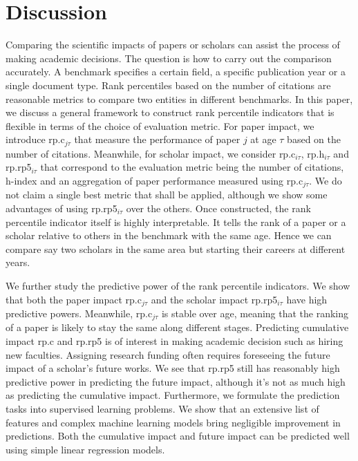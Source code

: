 \section*{Discussion}
Comparing the scientific impacts of papers or scholars can assist the process of making academic decisions. The question is how to carry out the comparison accurately. A benchmark specifies a certain field, a specific publication year or a single document type. Rank percentiles based on the number of citations are reasonable metrics to compare two entities in different benchmarks\supercite{bornmann2013use}. In this paper, we discuss a general framework to construct rank percentile indicators that is flexible in terms of the choice of evaluation metric. For paper impact, we introduce rp.c$_{j\tau}$ that measure the performance of paper $j$ at age $\tau$ based on the number of citations. Meanwhile, for scholar impact, we consider rp.c$_{i\tau}$, rp.h$_{i\tau}$ and rp.rp5$_{i\tau}$ that correspond to the evaluation metric being the number of citations, h-index and an aggregation of paper performance measured using rp.c$_{j\tau}$. We do not claim a single best metric that shall be applied, although we show some advantages of using rp.rp5$_{i\tau}$ over the others. Once constructed, the rank percentile indicator itself is highly interpretable. It tells the rank of a paper or a scholar relative to others in the benchmark with the same age. Hence we can compare say two scholars in the same area but starting their careers at different years. 

We further study the predictive power of the rank percentile indicators. We show that both the paper impact rp.c$_{j\tau}$ and the scholar impact rp.rp5$_{i\tau}$ have high predictive powers. Meanwhile, rp.c$_{j\tau}$ is stable over age, meaning that the ranking of a paper is likely to stay the same along different stages. Predicting cumulative impact rp.c and rp.rp5 is of interest in making academic decision such as hiring new faculties. Assigning research funding often requires foreseeing the future impact of a scholar's future works. We see that rp.rp5 still has reasonably high predictive power in predicting the future impact, although it's not as much high as predicting the cumulative impact. Furthermore, we formulate the prediction tasks into supervised learning problems. We show that an extensive list of features and complex machine learning models bring negligible improvement in predictions. Both the cumulative impact and future impact can be predicted well using simple linear regression models. 
